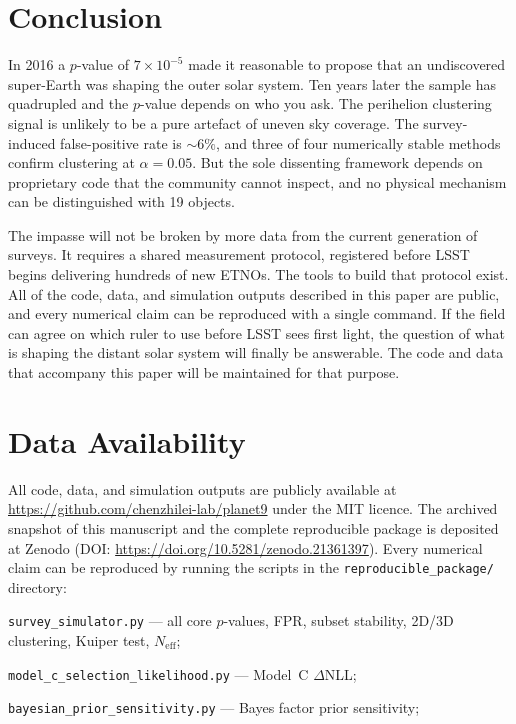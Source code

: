 \documentclass{aa}
\begin{document}
\section{Conclusion}

In 2016 a $p$-value of $7\times10^{-5}$ made it reasonable to propose that an undiscovered super-Earth was shaping the outer solar system. Ten years later the sample has quadrupled and the $p$-value depends on who you ask. The perihelion clustering signal is unlikely to be a pure artefact of uneven sky coverage. The survey-induced false-positive rate is $\sim6\%$, and three of four numerically stable methods confirm clustering at $\alpha=0.05$. But the sole dissenting framework depends on proprietary code that the community cannot inspect, and no physical mechanism can be distinguished with 19 objects.

The impasse will not be broken by more data from the current generation of surveys. It requires a shared measurement protocol, registered before LSST begins delivering hundreds of new ETNOs. The tools to build that protocol exist. All of the code, data, and simulation outputs described in this paper are public, and every numerical claim can be reproduced with a single command. If the field can agree on which ruler to use before LSST sees first light, the question of what is shaping the distant solar system will finally be answerable. The code and data that accompany this paper will be maintained for that purpose.

\section*{Data Availability}

All code, data, and simulation outputs are publicly available at \url{https://github.com/chenzhilei-lab/planet9} under the MIT licence. The archived snapshot of this manuscript and the complete reproducible package is deposited at Zenodo (DOI: \url{https://doi.org/10.5281/zenodo.21361397}). Every numerical claim can be reproduced by running the scripts in the \texttt{reproducible\_package/} directory:

\smallskip
\noindent\texttt{survey\_simulator.py} --- all core $p$-values, FPR, subset stability, 2D/3D clustering, Kuiper test, $N_\mathrm{eff}$;

\noindent\texttt{model\_c\_selection\_likelihood.py} --- Model~C $\Delta$NLL;

\noindent\texttt{bayesian\_prior\_sensitivity.py} --- Bayes factor prior sensitivity;
\end{document}
